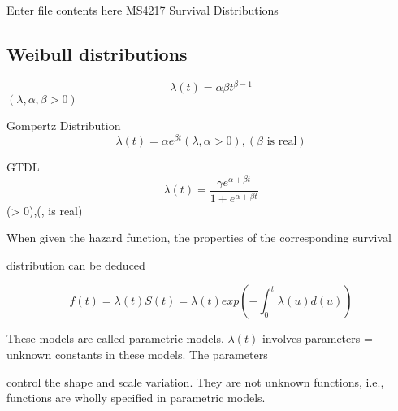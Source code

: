 Enter file contents here
MS4217 Survival Distributions


\subsection*{Weibull distributions} \[ \lambda(t) = \alpha \beta t^{\beta -1}   \]     $(\lambda , \alpha, \beta > 0)$


Gompertz Distribution \[ \lambda(t) = \alpha e^{\beta t}           (\lambda , \alpha > 0), ( \beta \mbox{ is real})\]


GTDL   \[  \lambda(t) = \frac{\gamma e^{\alpha+\beta t}}{1+e^{\alpha+\beta t}} \]                     (\lambda > 0),(\alpha , \beta is real)


When given the hazard function, the properties of the corresponding survival

distribution can be deduced

\[
f(t)=\lambda(t)S(t) = \lambda(t) exp(-\int_0^t \lambda(u)d(u))
\]

These models are called parametric models. $\lambda(t)$ involves parameters = unknown constants in these models. The parameters

control the shape and scale variation. They are not unknown functions, i.e., functions are wholly specified in parametric models.

